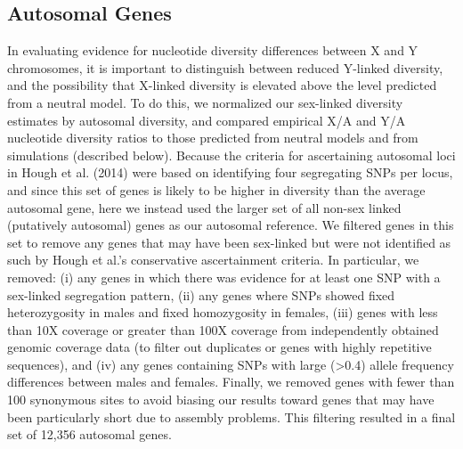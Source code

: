\documentclass[9pt,twocolumn,twoside]{gsajnl}
\begin{document}
\subsection*{Autosomal Genes}
In evaluating evidence for nucleotide diversity differences between X and Y chromosomes, it is important to distinguish between reduced Y-linked diversity, and the possibility that X-linked diversity is elevated above the level predicted from a neutral model. To do this, we normalized our sex-linked diversity estimates by autosomal diversity, and compared empirical X/A and Y/A nucleotide diversity ratios to those predicted from neutral models and from simulations (described below). Because the criteria for ascertaining autosomal loci in Hough et al. (2014) were based on identifying four segregating SNPs per locus, and since this set of genes is likely to be higher in diversity than the average autosomal gene, here we instead used the larger set of all non-sex linked (putatively autosomal) genes as our autosomal reference. We filtered genes in this set to remove any genes that may have been sex-linked but were not identified as such by Hough et al.'s conservative ascertainment criteria. In particular, we removed: (i) any genes in which there was evidence for at least one SNP with a sex-linked segregation pattern, (ii) any genes where SNPs showed fixed heterozygosity in males and fixed homozygosity in females, (iii) genes with less than 10X coverage or greater than 100X coverage from independently obtained genomic coverage data (to filter out duplicates or genes with highly repetitive sequences), and (iv) any genes containing SNPs with large (>0.4) allele frequency differences between males and females. Finally, we removed genes with fewer than 100 synonymous sites to avoid biasing our results toward genes that may have been particularly short due to assembly problems. This filtering resulted in a final set of 12,356 autosomal genes.
\end{document}
